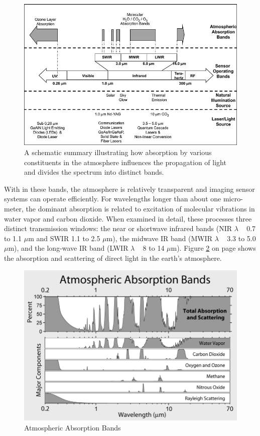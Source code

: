 \begin{figure}[ht!]
\centering
\includegraphics[scale = 0.8]{chapters/img/intro_atmosphere.png}
\caption{A schematic summary illustrating how absorption by various constituents in the atmosphere influences the propagation of light and divides the spectrum into distinct bands.}
\label{fig:intro_atmosphere}
\end{figure}

With in these bands, the atmosphere is relatively transparent and imaging sensor systems can operate efficiently. For wavelengths longer than about one micro-meter, the dominant absorption is related to excitation of molecular vibrations in water vapor and carbon dioxide. When examined in detail, these processes three distinct transmission windows: the near or shortwave infrared bands (\acs{NIR} $\lambda$ ~ 0.7 to 1.1 $\mu$m and \acs{SWIR} 1.1 to 2.5 $\mu$m), the midwave IR band (\acs{MWIR} $\lambda$ ~ 3.3 to 5.0 $\mu$m), and the long-wave IR band (\acs{LWIR} $\lambda$ ~ 8 to 14 $\mu$m). Figure \ref{fig:intro_atmosphere_bands} on page \pageref{fig:intro_atmosphere_bands} shows the absorption and scattering of direct light in the earth's atmosphere.

\begin{figure}[ht!]
\centering
\includegraphics[scale = 0.45]{chapters/img/intro_atmosphere_bands.png}
\caption{Atmospheric Absorption Bands}
\label{fig:intro_atmosphere_bands}
\end{figure}

